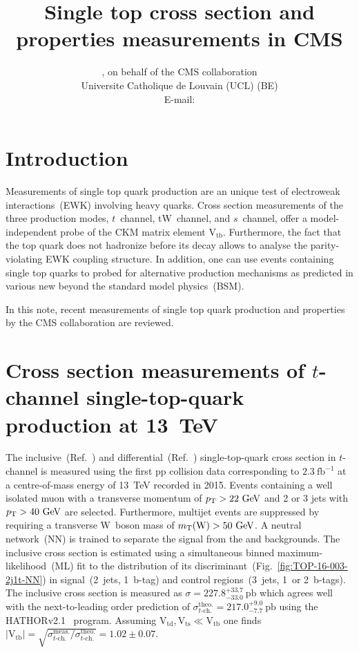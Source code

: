 \documentclass{PoS}
\title{Single top cross section and properties measurements in CMS}
\author{
    \speaker{Matthias Komm}, on behalf of the CMS collaboration\\
    Universite Catholique de Louvain (UCL) (BE)\\
    E-mail: \email{Matthias.Komm@cern.ch}
}
\begin{document}
\section{Introduction}
Measurements of single top quark production are an unique test of electroweak interactions~(EWK) involving heavy quarks. Cross section measurements of the three production modes, $t$~channel, tW~channel, and $s$~channel, offer a model-independent probe of the CKM matrix element $\mathrm{V}_\mathrm{tb}$. Furthermore, the fact that the top quark does not hadronize before its decay allows to analyse the parity-violating EWK coupling structure. In addition, one can use events containing single top quarks to probed for alternative production mechanisms as predicted in various new beyond the standard model physics~(BSM).

In this note, recent measurements of single top quark production and properties by the CMS collaboration are reviewed.


\section{Cross section measurements of $t$-channel single-top-quark production at 13~TeV}

The inclusive~(Ref.~\cite{CMS-PAS-TOP-16-003}) and differential~(Ref.~\cite{CMS-PAS-TOP-16-004}) single-top-quark cross section in $t$-channel is measured using the first pp collision data corresponding to $2.3~\mathrm{fb^{-1}}$ at a centre-of-mass energy of 13~TeV recorded in 2015. Events containing a well isolated muon with a transverse momentum of $p_\mathrm{T}>22~\mathrm{GeV}$ and 2 or 3 jets with $p_\mathrm{T}>40~\mathrm{GeV}$ are selected. Furthermore, multijet events are suppressed by requiring a transverse W~boson mass of $m_{\mathrm{T}}(\mathrm{W})>50~\mathrm{GeV}$. A neutral network~(NN) is trained to separate the signal from the \wjets and \ttbar backgrounds. The inclusive cross section is estimated using a simultaneous binned maximum-likelihood~(ML) fit to the distribution of its discriminant~(Fig.~\ref{fig:TOP-16-003-2j1t-NN}) in signal~(2~jets, 1~b-tag) and control regions~(3~jets, 1~or 2~b-tags). The inclusive cross section is measured as $\sigma=227.8^{+33.7}_{-33.0}~\mathrm{pb}$ which agrees well with the next-to-leading order prediction of $\sigma_{t\mbox{-}\mathrm{ch.}}^\mathrm{theo.}=217.0^{+9.0}_{-7.7}~\mathrm{pb}$ using the \textsc{HATHOR}v2.1~\cite{hathor} program. Assuming $\mathrm{V}_\mathrm{td},\mathrm{V}_\mathrm{ts}\ll\mathrm{V}_\mathrm{tb} $ one finds $|\mathrm{V}_\mathrm{tb}|=\sqrt{\sigma_{t\mbox{-}\mathrm{ch.}}^\mathrm{meas.}/\sigma_{t\mbox{-}\mathrm{ch.}}^\mathrm{theo.}}=1.02\pm0.07$.
\end{document}
